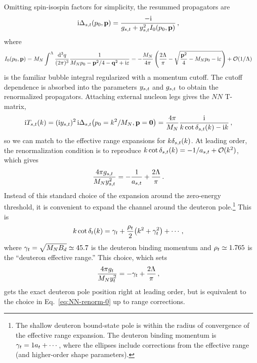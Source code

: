 Omitting spin-isospin factors for simplicity, the resummed propagators are
%
\begin{equation}
 \mathrm{i}\Delta_{{s,t}}(p_0,\mathbf{p})
 = \frac{-\mathrm{i}}{g_{{s,t}} + y_{{s,t}}^2 I_0(p_0,\mathbf{p})} \,,
\end{equation}
%
where
%
\begin{multline}
 I_0(p_0,\vp) = \MN\int^\Lambda \frac{\dd^3q}{(2\pi)^3}
 \frac{1}{\MN p_0 - \vp^2/4 - \vq^2 + \ii\eps}
 = {-}\frac{\MN}{4\pi}
 \left(\frac{2\Lambda}{\pi} - \sqrt{\frac{\vp^2}{4}-\MN p_0-\ii\eps}\right)
 +\OO(1/\Lambda)
\label{eq:I0-cutoff}
\end{multline}
%
is the familiar bubble integral regularized with a momentum cutoff.  The cutoff 
dependence is absorbed into the parameters $y_{{s,t}}$ and $g_{{s,t}}$ to obtain the 
renormalized propagators.  Attaching external nucleon legs gives the $NN$ 
T-matrix,
%
\begin{equation}
 \ii T_\st(k)
 = (\ii \yst)^2\, \ii\Delta_\st\!\left(p_0=k^2/\MN,\vp=\vZero\right)
 = \frac{4\pi}{M_N}\frac{\ii}{k\cot\delta_\st(k) - \ii k}\,,
\label{eq:Tnd}
\end{equation}
%
so we can match to the effective range expansions for $k\delta_{{s,t}}(k)$.  At 
leading order, the renormalization condition is to reproduce
$k\cot\delta_{{s,t}}(k) = {-}1/{a_{{s,t}}} + \mathcal{O}(k^2)$, which gives
%
\begin{equation}
 \frac{4\pi\sigst}{\MN\yst^2} = {-}\frac{1}{a_\st} + \frac{2\Lambda}{\pi} \,.
\label{eq:NN-renorm-0}
\end{equation}
%
Instead of this standard choice of the expansion around the zero-energy 
threshold, it is convenient to expand the \ThreeSOne channel around the 
deuteron pole.\footnote{The shallow deuteron bound-state pole is within the 
radius of convergence of the effective range expansion. The deuteron binding 
momentum is $\gamma_t=1a_t + \cdots$, where the ellipses include corrections from 
the effective range (and higher-order shape parameters).}  This is
%
\begin{equation}
 k\cot\delta_t(k) = \gamma_t + \dfrac{\rho_t}2\big(k^2+\gamma_t^2\big) + \cdots \,,
\end{equation}
%
where $\gamma_t = \sqrt{\mathstrut M_N B_d}\simeq 45.7$ is the deuteron binding 
momentum and $\rho_t\simeq 1.765$ is the ``deuteron effective range.''  This 
choice, which sets
%
\begin{equation}
 \frac{4\pi\sigt}{\MN\yt^2} = {-}\gamt + \frac{2\Lambda}{\pi} \,,
\label{eq:NN-renorm-deut}
\end{equation}
%
gets the exact deuteron pole position right at leading order, but is equivalent 
to the choice in Eq.~\eqref{eq:NN-renorm-0} up to range corrections.

